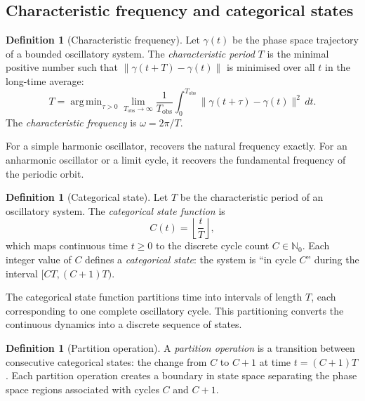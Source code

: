 \documentclass[twocolumn,10pt,a4paper]{article}
\theoremstyle{definition}
\newtheorem{definition}[theorem]{Definition}
\theoremstyle{remark}
\newcommand{\N}{\mathbb{N}}
\DeclareMathOperator*{\argmin}{arg\,min}
\begin{document}
\subsection{Characteristic frequency and categorical states}

\begin{definition}[Characteristic frequency]\label{def:char_freq}
Let $\gamma(t)$ be the phase space trajectory of a bounded oscillatory system. The \emph{characteristic period} $T$ is the minimal positive number such that $\|\gamma(t+T) - \gamma(t)\|$ is minimised over all $t$ in the long-time average:
\begin{equation}\label{eq:char_period}
T = \argmin_{\tau > 0} \lim_{T_{\mathrm{obs}} \to \infty} \frac{1}{T_{\mathrm{obs}}} \int_0^{T_{\mathrm{obs}}} \|\gamma(t+\tau) - \gamma(t)\|^2 \, dt.
\end{equation}
The \emph{characteristic frequency} is $\omega = 2\pi/T$.
\end{definition}

For a simple harmonic oscillator,  recovers the natural frequency exactly. For an anharmonic oscillator or a limit cycle, it recovers the fundamental frequency of the periodic orbit.

\begin{definition}[Categorical state]\label{def:categorical_state}
Let $T$ be the characteristic period of an oscillatory system. The \emph{categorical state function} is
\begin{equation}\label{eq:categorical_state}
C(t) = \left\lfloor \frac{t}{T} \right\rfloor,
\end{equation}
which maps continuous time $t \geq 0$ to the discrete cycle count $C \in \N_0$. Each integer value of $C$ defines a \emph{categorical state}: the system is ``in cycle $C$'' during the interval $[CT, (C+1)T)$.
\end{definition}

The categorical state function partitions time into intervals of length $T$, each corresponding to one complete oscillatory cycle. This partitioning converts the continuous dynamics into a discrete sequence of states.

\begin{definition}[Partition operation]\label{def:partition_op}
A \emph{partition operation} is a transition between consecutive categorical states: the change from $C$ to $C+1$ at time $t = (C+1)T$. Each partition operation creates a boundary in state space separating the phase space regions associated with cycles $C$ and $C+1$.
\end{definition}
\end{document}

